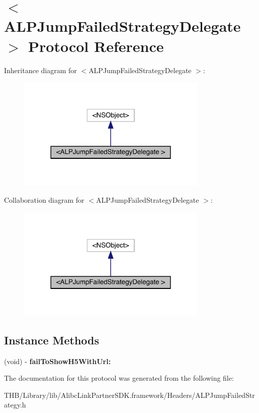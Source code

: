 \hypertarget{protocol_a_l_p_jump_failed_strategy_delegate_01-p}{}\section{$<$A\+L\+P\+Jump\+Failed\+Strategy\+Delegate $>$ Protocol Reference}
\label{protocol_a_l_p_jump_failed_strategy_delegate_01-p}


Inheritance diagram for $<$A\+L\+P\+Jump\+Failed\+Strategy\+Delegate $>$\+:\nopagebreak
\begin{figure}[H]
\begin{center}
\leavevmode
\includegraphics[width=258pt]{protocol_a_l_p_jump_failed_strategy_delegate_01-p__inherit__graph}
\end{center}
\end{figure}


Collaboration diagram for $<$A\+L\+P\+Jump\+Failed\+Strategy\+Delegate $>$\+:\nopagebreak
\begin{figure}[H]
\begin{center}
\leavevmode
\includegraphics[width=258pt]{protocol_a_l_p_jump_failed_strategy_delegate_01-p__coll__graph}
\end{center}
\end{figure}
\subsection*{Instance Methods}
\begin{DoxyCompactItemize}
\item 
\mbox{\label{protocol_a_l_p_jump_failed_strategy_delegate_01-p_a56bd0221795624a9d4814b8bf1f504ef}} 
(void) -\/ {\bfseries fail\+To\+Show\+H5\+With\+Url\+:}
\end{DoxyCompactItemize}


The documentation for this protocol was generated from the following file\+:\begin{DoxyCompactItemize}
\item 
T\+H\+B/\+Library/lib/\+Alibc\+Link\+Partner\+S\+D\+K.\+framework/\+Headers/A\+L\+P\+Jump\+Failed\+Strategy.\+h\end{DoxyCompactItemize}
